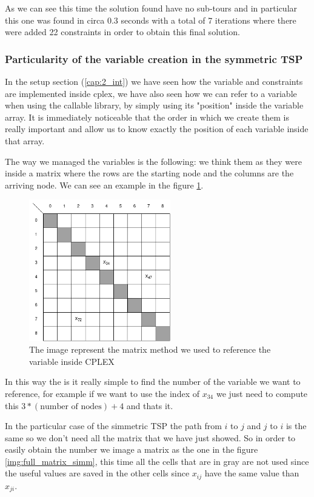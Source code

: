 As we can see this time the solution found have no sub-tours and in particular this one was found in circa $0.3$ seconds with a total of 7 iterations where there were added 22 constraints in order to obtain this final solution.

\subsubsection{Particularity of the variable creation in the symmetric TSP}
In the setup section (\ref{cap:2_int}) we have seen how the variable and constraints are implemented inside cplex, we have also seen how we can refer to a variable when using the callable library, by simply using its "position" inside the variable array. It is immediately noticeable that the order in which we create them is really important and allow us to know exactly the position of each variable inside that array.

The way we managed the variables is the following: we think them as they were inside a matrix where the rows are the starting node and the columns are the arriving node. We can see an example in the figure \ref{img:full_matrix}.

\begin{figure}[h]
	\centering
	\includegraphics[width=0.55\textwidth]{images/full_matrix}
	\caption{The image represent the matrix method we used to reference the variable inside CPLEX}
	\label{img:full_matrix}
\end{figure}

In this way the is it really simple to find the number of the variable we want to reference, for example if we want to use the index of $x_{34}$ we just need to compute this $3 * (\text{number of nodes}) + 4$ and thats it.

In the particular case of the simmetric TSP the path from $i$ to $j$ and $j$ to $i$ is the same so we don't need all the matrix that we have just showed. So in order to easily obtain the number we image a matrix as the one in the figure \ref{img:full_matrix_simm}, this time all the cells that are in gray are not used since the useful values are saved in the other cells since $x_{ij}$ have the same value than $x_{ji}$.


